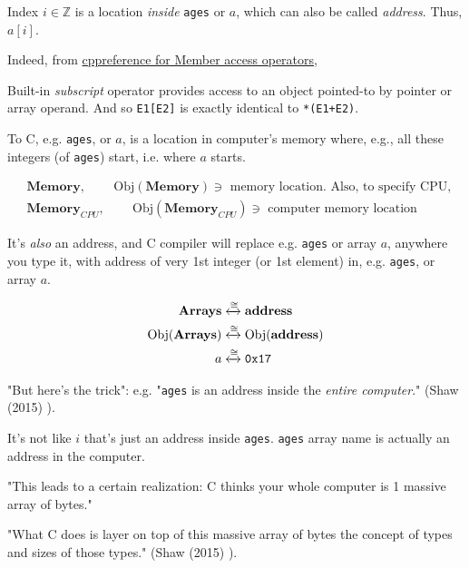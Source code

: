 \documentclass[10pt]{amsart}
\begin{document}
\begin{multicols*}{2}
Index $i\in \mathbb{Z}$ is a location \emph{inside} \verb|ages| or $a$, which can also be called \emph{address}.  Thus, $a[i]$.  

Indeed, from \href{http://en.cppreference.com/w/cpp/language/operator_member_access}{cppreference for Member access operators}, 

Built-in \emph{subscript} operator provides access to an object pointed-to by pointer or array operand.  And so \verb|E1[E2]| is exactly identical to \verb|*(E1+E2)|.  


To C, e.g. \verb|ages|, or $a$, is a location in computer's memory where, e.g., all these integers (of \verb|ages|) start, i.e. where $a$ starts.  

\[
\begin{aligned}
& \textbf{Memory} , \qquad \, \text{Obj}{(\textbf{Memory})} \ni \text{ memory location.  Also, to specify CPU, } \\ 
& \textbf{Memory}_{CPU} , \qquad \, \text{Obj}{(\textbf{Memory}_{CPU})} \ni \text{ computer memory location }
\end{aligned}
\]

It's \emph{also} an address, and C compiler will replace e.g. \verb|ages| or array $a$, anywhere you type it, with address of very 1st integer (or 1st element) in, e.g. \verb|ages|, or array $a$.  

\[
\begin{gathered}
	\begin{aligned}
	\textbf{Arrays} & \xleftrightarrow{ \cong } \textbf{address}  \\
	\text{Obj}{(\textbf{Arrays} )} & \xleftrightarrow{ \cong } \text{Obj}{(\textbf{address} )}  \\
	a & \xleftrightarrow{ \cong } \verb|0x17|  \\
	\end{aligned}
\end{gathered}
\]

"But here's the trick": e.g. "\verb|ages| is an address inside the \emph{entire computer}." (Shaw (2015) \cite{Shaw2015}).  

It's not like $i$ that's just an address inside \verb|ages|.  \verb|ages| array name is actually an address in the computer.     

"This leads to a certain realization: C thinks your whole computer is 1 massive array of bytes."  

"What C does is layer on top of this massive array of bytes the concept of types and sizes of those types." (Shaw (2015) \cite{Shaw2015}).  



\end{multicols*}
\end{document}
